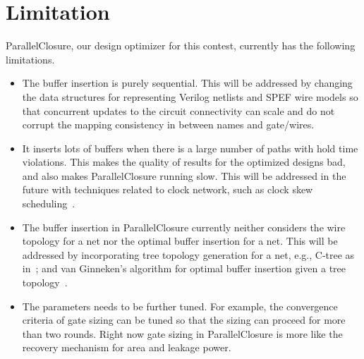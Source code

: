 \section{Limitation}
\label{sec:limit}

ParallelClosure, our design optimizer for this contest, currently has the following limitations.

\begin{itemize}
\item The buffer insertion is purely sequential. This will be addressed by changing the data structures for representing Verilog netlists and SPEF wire models so that concurrent updates to the circuit connectivity can scale and do not corrupt the mapping consistency in between names and gate/wires.
\item It inserts lots of buffers when there is a large number of paths with hold time violations. This makes the quality of results for the optimized designs bad, and also makes ParallelClosure running slow. This will be addressed in the future with techniques related to clock network, such as clock skew scheduling~\cite{Friedman:Clock}.
\item The buffer insertion in ParallelClosure currently neither considers the wire topology for a net nor the optimal buffer insertion for a net. This will be addressed by incorporating tree topology generation for a net, e.g., C-tree as in~\cite{Alpert:Buffered}; and van Ginneken's algorithm for optimal buffer insertion given a tree topology~\cite{Lukas:Buffer}. 
\item The parameters needs to be further tuned. For example, the convergence criteria of gate sizing can be tuned so that the sizing can proceed for more than two rounds. Right now gate sizing in ParallelClosure is more like the recovery mechanism for area and leakage power.
\end{itemize}
